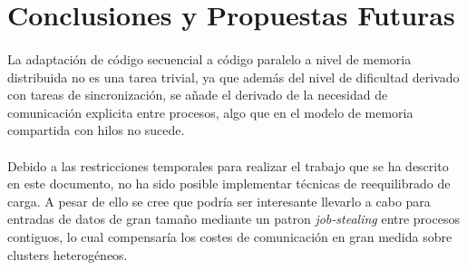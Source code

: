 \documentclass[10pt, a4paper,spanish]{article}
\begin{document}
	\section{Conclusiones y Propuestas Futuras}

		\paragraph{}
		La adaptación de código secuencial a código paralelo a nivel de memoria distribuida no es una tarea trivial, ya que además del nivel de dificultad derivado con tareas de sincronización, se añade el derivado de la necesidad de comunicación explicita entre procesos, algo que en el modelo de memoria compartida con hilos no sucede.

		\paragraph{}
		Debido a las restricciones temporales para realizar el trabajo que se ha descrito en este documento, no ha sido posible implementar técnicas de reequilibrado de carga. A pesar de ello se cree que podría ser interesante llevarlo a cabo para entradas de datos de gran tamaño mediante un patron \emph{job-stealing} entre procesos contiguos, lo cual compensaría los costes de comunicación en gran medida sobre clusters heterogéneos. 

	\nocite{subject:cp}
  
  
\end{document}

